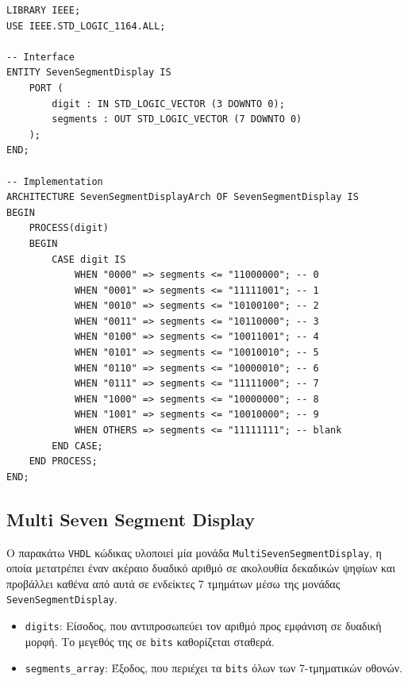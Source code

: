 \documentclass[conference]{IEEEtran}
\begin{document}
\begin{lstlisting}[caption=Seven Segment Display VHDL Code, label=lst:ssd]
LIBRARY IEEE;
USE IEEE.STD_LOGIC_1164.ALL;

-- Interface
ENTITY SevenSegmentDisplay IS
	PORT (
		digit : IN STD_LOGIC_VECTOR (3 DOWNTO 0);
		segments : OUT STD_LOGIC_VECTOR (7 DOWNTO 0)
	);
END;

-- Implementation
ARCHITECTURE SevenSegmentDisplayArch OF SevenSegmentDisplay IS
BEGIN
	PROCESS(digit)
	BEGIN
		CASE digit IS
			WHEN "0000" => segments <= "11000000"; -- 0
			WHEN "0001" => segments <= "11111001"; -- 1
			WHEN "0010" => segments <= "10100100"; -- 2
			WHEN "0011" => segments <= "10110000"; -- 3
			WHEN "0100" => segments <= "10011001"; -- 4
			WHEN "0101" => segments <= "10010010"; -- 5
			WHEN "0110" => segments <= "10000010"; -- 6
			WHEN "0111" => segments <= "11111000"; -- 7
			WHEN "1000" => segments <= "10000000"; -- 8
			WHEN "1001" => segments <= "10010000"; -- 9
			WHEN OTHERS => segments <= "11111111"; -- blank
		END CASE;
	END PROCESS;
END;
\end{lstlisting}

\subsection{Multi Seven Segment Display}
Ο παρακάτω \texttt{VHDL} κώδικας υλοποιεί μία μονάδα \texttt{MultiSevenSegmentDisplay}, η οποία μετατρέπει έναν ακέραιο δυαδικό αριθμό σε ακολουθία δεκαδικών ψηφίων και προβάλλει καθένα από αυτά σε ενδείκτες 7 τμημάτων μέσω της μονάδας \texttt{SevenSegmentDisplay}.

\begin{itemize}
    \item \texttt{digits}: Είσοδος, που αντιπροσωπεύει τον αριθμό προς εμφάνιση σε δυαδική μορφή. Το μεγεθός της σε \texttt{bits} καθορίζεται σταθερά.
    \item \texttt{segments\_array}: Έξοδος, που περιέχει τα \texttt{bits} όλων των 7-τμηματικών οθονών.
\end{itemize}
\end{document}
